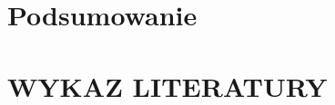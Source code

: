 \documentclass[10pt, a4paper]{report}
\begin{document}
\subsubsection{}

\section{}
\section{}
\section{}
\section{}
\section{}
\section{}
\section{}
\section{Podsumowanie}



\newpage
{}
\section*{WYKAZ LITERATURY}

\renewcommand{\labelenumi}{[\arabic{enumi}]}
\end{document}
